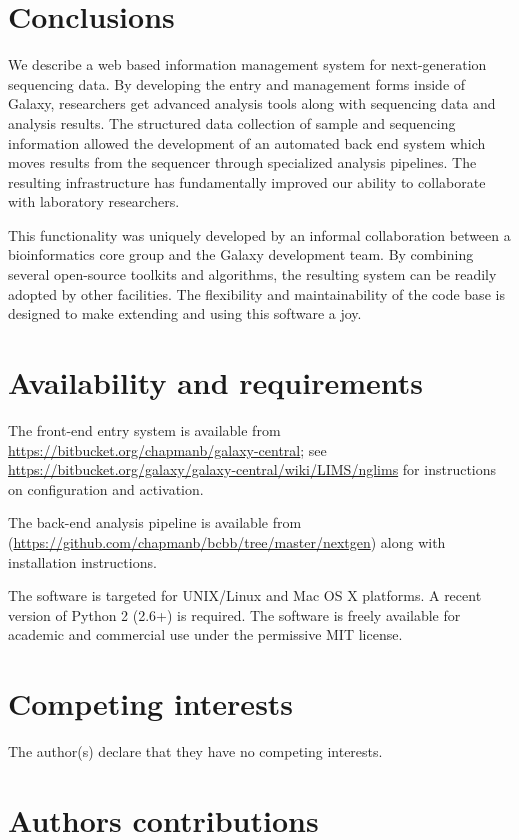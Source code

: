 \documentclass[10pt]{bmc_article}
\newenvironment{bmcformat}{\begin{raggedright}\baselineskip20pt\sloppy\setboolean{publ}{false}}{\end{raggedright}\baselineskip20pt\sloppy}
\begin{document}
\begin{bmcformat}
\section*{Conclusions}

We describe a web based information management system for
next-generation sequencing data. By developing the entry and
management forms inside of Galaxy, researchers get advanced analysis
tools along with sequencing data and analysis results. The structured
data collection of sample and sequencing information allowed the
development of an automated back end system which moves results from
the sequencer through specialized analysis pipelines. The resulting
infrastructure has fundamentally improved our ability to collaborate
with laboratory researchers.

This functionality was uniquely developed by an informal collaboration
between a bioinformatics core group and the Galaxy development
team. By combining several open-source toolkits and algorithms, the
resulting system can be readily adopted by other facilities. The
flexibility and maintainability of the code base is designed to make
extending and using this software a joy.

\section*{Availability and requirements}

The front-end entry system is available from
\url{https://bitbucket.org/chapmanb/galaxy-central}; see
\url{https://bitbucket.org/galaxy/galaxy-central/wiki/LIMS/nglims} for
instructions on configuration and activation.

The back-end analysis pipeline is available from
(\url{https://github.com/chapmanb/bcbb/tree/master/nextgen}) along
with installation instructions.

The software is targeted for UNIX/Linux and Mac OS X platforms. A
recent version of Python 2 (2.6+) is required. The software is
freely available for academic and commercial use under the
permissive MIT license.

\section*{Competing interests}

The author(s) declare that they have no competing interests.

\section*{Authors contributions}


\end{bmcformat}
\end{document}
